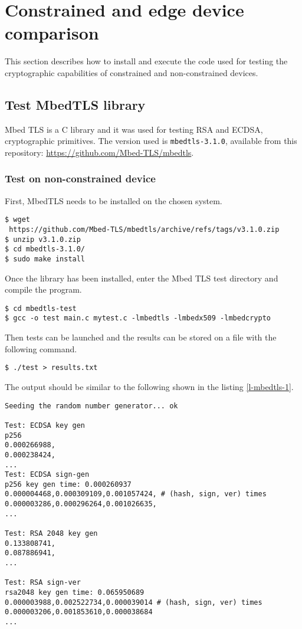 
\section{Constrained and edge device comparison}
This section describes how to install and execute the code used for testing the cryptographic capabilities of constrained and non-constrained devices.
\subsection{Test MbedTLS library}
Mbed TLS \cite{mbed-tls} is a C library and it was used for testing RSA and ECDSA, cryptographic primitives. The version used is \texttt{mbedtls-3.1.0}, available from this repository: \url{https://github.com/Mbed-TLS/mbedtls}. 

\subsubsection{Test on non-constrained device}
First, MbedTLS needs to be installed on the chosen system. 
\begin{lstlisting}[frame=single]
$ wget 
 https://github.com/Mbed-TLS/mbedtls/archive/refs/tags/v3.1.0.zip
$ unzip v3.1.0.zip
$ cd mbedtls-3.1.0/
$ sudo make install
\end{lstlisting}

Once the library has been installed, enter the Mbed TLS test directory and compile the program.  
\begin{lstlisting}[frame=single]
$ cd mbedtls-test
$ gcc -o test main.c mytest.c -lmbedtls -lmbedx509 -lmbedcrypto
\end{lstlisting}

Then tests can be launched and the results can be stored on a file with the following command. 
\begin{lstlisting}[frame=single]
$ ./test > results.txt
\end{lstlisting}

The output should be similar to the following shown in the listing \ref{l-mbedtls-1}. 
\begin{lstlisting}[caption={Example of MbedTLS tests output on non-constrained device},captionpos=b,label={l-mbedtls-1},style=DOS,frame=single]
Seeding the random number generator... ok

Test: ECDSA key gen
p256
0.000266988,
0.000238424,
...
Test: ECDSA sign-gen
p256 key gen time: 0.000260937
0.000004468,0.000309109,0.001057424, # (hash, sign, ver) times
0.000003286,0.000296264,0.001026635,
...

Test: RSA 2048 key gen
0.133808741,
0.087886941,
...

Test: RSA sign-ver
rsa2048 key gen time: 0.065950689
0.000003988,0.002522734,0.000039014 # (hash, sign, ver) times
0.000003206,0.001853610,0.000038684
...
\end{lstlisting}

